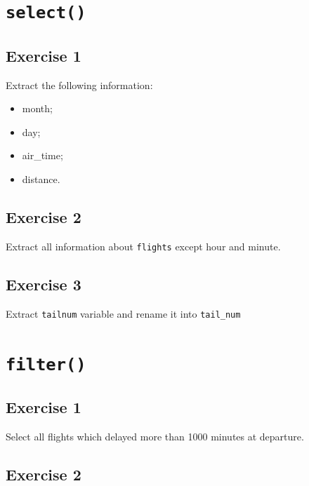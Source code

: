 \documentclass[]{book}
\providecommand{\tightlist}{%
  \setlength{\itemsep}{0pt}\setlength{\parskip}{0pt}}
\def\tightlist{}
\begin{document}
\clearpage

\section{\texorpdfstring{\texttt{select()}}{select()}}\label{select}

\subsection{Exercise 1}\label{exercise-1-8}

Extract the following information:

\begin{itemize}
\tightlist
\item
  month;
\item
  day;
\item
  air\_time;
\item
  distance.
\end{itemize}

\subsection{Exercise 2}\label{exercise-2-3}

Extract all information about \texttt{flights} except hour and minute.

\subsection{Exercise 3}\label{exercise-3}

Extract \texttt{tailnum} variable and rename it into \texttt{tail\_num}

\section{\texorpdfstring{\texttt{filter()}}{filter()}}\label{filter}

\subsection{Exercise 1}\label{exercise-1-9}

Select all flights which delayed more than 1000 minutes at departure.

\subsection{Exercise 2}\label{exercise-2-4}
\end{document}
